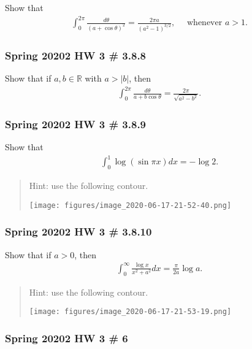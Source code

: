 Show that
\begin{align*}
\int_{0}^{2 \pi} \frac{d \theta}{(a+\cos \theta)^{2}}=\frac{2 \pi a}{\left(a^{2}-1\right)^{3 / 2}}, \quad \text { whenever } a>1
.\end{align*}

\hypertarget{spring-20202-hw-3-3.8.8}{%
\subsubsection{Spring 20202 HW 3 \#
3.8.8}\label{spring-20202-hw-3-3.8.8}}

Show that if \(a,b\in {\mathbb{R}}\) with
\(a > {\left\lvert {b} \right\rvert}\), then
\begin{align*}
\int_{0}^{2 \pi} \frac{d \theta}{a+b \cos \theta}=\frac{2 \pi}{\sqrt{a^{2}-b^{2}}}
.\end{align*}

\hypertarget{spring-20202-hw-3-3.8.9}{%
\subsubsection{Spring 20202 HW 3 \#
3.8.9}\label{spring-20202-hw-3-3.8.9}}

Show that
\begin{align*}
\int_{0}^{1} \log (\sin \pi x) d x=-\log 2
.\end{align*}

\begin{quote}
Hint: use the following contour.

\texttt{[image: figures/image\_2020-06-17-21-52-40.png]}
\end{quote}

\hypertarget{spring-20202-hw-3-3.8.10}{%
\subsubsection{Spring 20202 HW 3 \#
3.8.10}\label{spring-20202-hw-3-3.8.10}}

Show that if \(a>0\), then
\begin{align*}
\int_{0}^{\infty} \frac{\log x}{x^{2}+a^{2}} d x=\frac{\pi}{2 a} \log a
.\end{align*}

\begin{quote}
Hint: use the following contour.

\texttt{[image: figures/image\_2020-06-17-21-53-19.png]}
\end{quote}

\hypertarget{spring-20202-hw-3-6}{%
\subsubsection{Spring 20202 HW 3 \# 6}\label{spring-20202-hw-3-6}}

